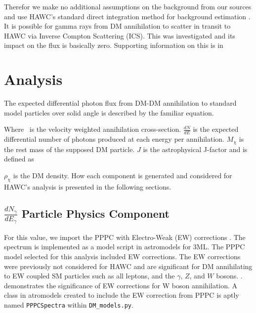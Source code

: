 Therefor we make no additional assumptions on the background from our sources and use HAWC's standard direct integration method for background estimation \cite{Abeysekara_2017}.
It is possible for gamma rays from DM annihilation to scatter in transit to HAWC via Inverse Compton Scattering (ICS).
This was investigated and its impact on the flux is basically zero.
Supporting information on this is in 

\section{Analysis}\label{sec:gd_analysis}

The expected differential photon flux from DM-DM annihilation to standard model
particles over solid angle is described by the familiar equation.
\iddmannilation[\gamma]

Where \sv~is the velocity weighted annihilation cross-section.
$\frac{dN}{dE}$ is the expected differential number of photons produced at each energy per annihilation.
$M_\chi$ is the rest mass of the supposed DM particle.
$J$ is the astrophysical J-factor and is defined as
\jfactor

$\rho_{\chi}$ is the DM density.
How each component is generated and considered for HAWC's analysis is presented in the following sections.

\subsection{$\frac{dN_\gamma}{dE_\gamma}$ Particle Physics Component}\label{sec:gd_particlephysics}

For this value, we import the PPPC with Electro-Weak (EW) corrections \cite{Cirelli_2011}.
The spectrum is implemented as a model script in astromodels for 3ML.
The PPPC model selected for this analysis included EW corrections.
The EW corrections were previously not considered for HAWC and are significant for DM annihilating to EW coupled SM particles such as all leptons, and the $\gamma$, $Z$, and $W$ bosons. \cite{Albert_2018}.
 demonstrates the significance of EW corrections for W boson annihilation.
A class in atromodels created to include the EW correction from PPPC is aptly named \texttt{PPPCSpectra} within \texttt{DM\_models.py}.

